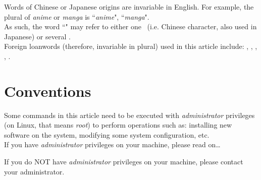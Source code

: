 Words of Chinese or Japanese origins are invariable in English. For example, the plural of \emph{anime} or \emph{manga} is ``\emph{anime}", ``\emph{manga}". \\

As such, the word ``\kanji" may refer to either one \kanji\ (i.e. Chinese character, also used in Japanese) or several \kanji. \\

Foreign loanwords (therefore, invariable in plural) used in this article include: \kanji, \hiragana, \katakana, \furigana, \ppinyin.




\section*{Conventions}


Some commands in this article need to be executed with \emph{administrator} privileges (on Linux, that means \emph{root}) to perform operations such as: installing new software on the system, modifying some system configuration, etc. \\

If you have \emph{administrator} privileges on your machine, please read on\ldots



If you do NOT have \emph{administrator} privileges on your machine, please contact your administrator.

